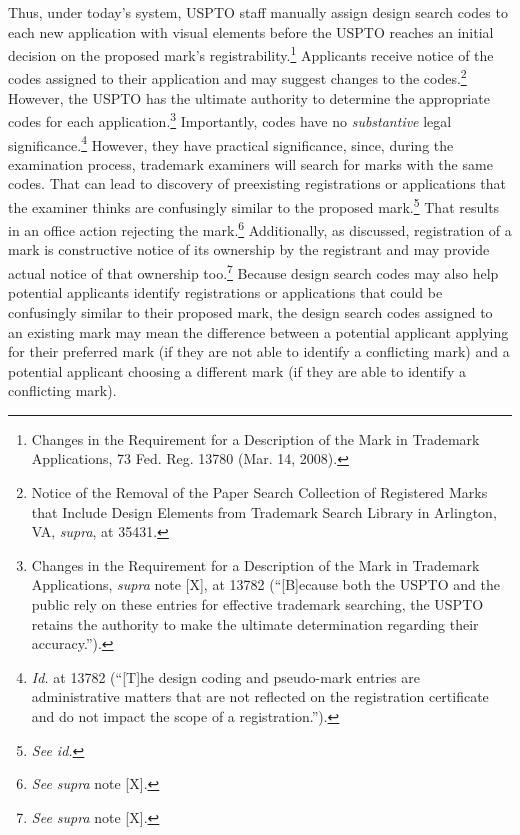 \documentclass[letterpaper, 11pt, oneside]{article}
\begin{document}
Thus, under today's system, USPTO staff manually assign design search codes to each new application with visual elements before the USPTO reaches an initial decision on the proposed mark's registrability.\footnote{Changes in the Requirement for a Description of the Mark in Trademark Applications, 73 Fed. Reg. 13780 (Mar. 14, 2008).} Applicants receive notice of the codes assigned to their application and may suggest changes to the codes.\footnote{Notice of the Removal of the Paper Search Collection of Registered Marks that Include Design Elements from Trademark Search Library in Arlington, VA, \textit{supra}, at 35431.} However, the USPTO has the ultimate authority to determine the appropriate codes for each application.\footnote{Changes in the Requirement for a Description of the Mark in Trademark Applications, \textit{supra} note [X], at 13782 (``[B]ecause both the USPTO and the public rely on these entries for effective trademark searching, the USPTO retains the authority to make the ultimate determination regarding their accuracy.'').} Importantly, codes have no \textit{substantive} legal significance.\footnote{\textit{Id.} at 13782 (``[T]he design coding and pseudo-mark entries are administrative matters that are not reflected on the registration certificate and do not impact the scope of a registration.'').} However, they have practical significance, since, during the examination process, trademark examiners will search for marks with the same codes. That can lead to discovery of preexisting registrations or applications that the examiner thinks are confusingly similar to the proposed mark.\footnote{\textit{See id.}} That results in an office action rejecting the mark.\footnote{\textit{See supra} note [X].} Additionally, as discussed, registration of a mark is constructive notice of its ownership by the registrant and may provide actual notice of that ownership too.\footnote{\textit{See supra} note [X].}  Because design search codes may also help potential applicants identify registrations or applications that could be confusingly similar to their proposed mark, the design search codes assigned to an existing mark may mean the difference between a potential applicant applying for their preferred mark (if they are not able to identify a conflicting mark) and a potential applicant choosing a different mark (if they are able to identify a conflicting mark).
\end{document}
